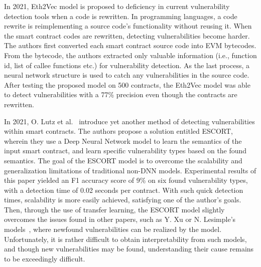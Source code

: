 In 2021, Eth2Vec model is proposed to deficiency in current vulnerability detection tools when a code is rewritten. In programming languages, a code rewrite is reimplementing a source code's functionality without reusing it.
When the smart contract codes are rewritten, detecting vulnerabilities become harder.
The authors first converted each smart contract source code into EVM bytecodes.
From the bytecode, the authors extracted only valuable information (i.e., function id, list of callee functions etc.) for vulnerability detection.
As the last process, a neural network structure is used to catch any vulnerabilities in the source code.
After testing the proposed model on 500 contracts, the Eth2Vec model was able to detect vulnerabilities with a 77\% precision even though the contracts are rewritten.

In 2021, O. Lutz et al.~\cite{dolan2016lava} introduce yet another method of detecting vulnerabilities within smart contracts.
The authors propose a solution entitled ESCORT, wherein they use a Deep Neural Network model to learn the semantics of the input smart contract, and learn specific vulnerability types based on the found semantics.
The goal of the ESCORT model is to overcome the scalability and generalization limitations of traditional non-DNN models.
Experimental results of this paper yielded an F1 accuracy score of 9\% on six found vulnerability types, with a detection time of 0.02 seconds per contract.
With such quick detection times, scalability is more easily achieved, satisfying one of the author's goals.
Then, through the use of transfer learning, the ESCORT model slightly overcomes the issues found in other papers, such as Y. Xu or N. Lesimple's models~\cite{grech2019gigahorse}, where newfound vulnerabilities can be realized by the model.
Unfortunately, it is rather difficult to obtain interpretability from such models, and though new vulnerabilities may be found, understanding their cause remains to be exceedingly difficult.

